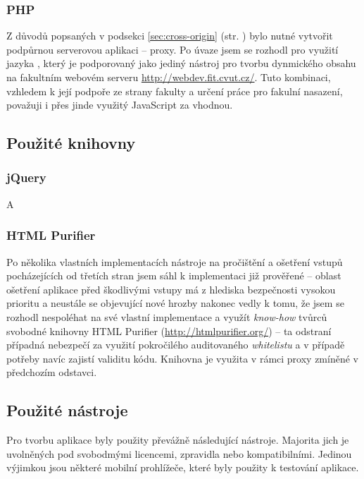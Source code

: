 \subsubsection{PHP}
Z důvodů popsaných v podsekci \ref{sec:cross-origin} (str. \pageref{sec:cross-origin}) bylo nutné vytvořit podpůrnou serverovou aplikaci -- proxy. Po úvaze jsem se rozhodl pro využití jazyka , který je podporovaný jako jediný nástroj pro tvorbu dynmického obsahu na fakultním webovém serveru \url{http://webdev.fit.cvut.cz/}. Tuto kombinaci, vzhledem k její podpoře ze strany fakulty a určení práce pro fakulní nasazení, považuji i přes jinde využitý JavaScript za vhodnou.


\subsection{Použité knihovny}

\subsubsection{jQuery}
A

\subsubsection{HTML Purifier}
Po několika vlastních implementacích nástroje na pročištění a ošetření  vstupů pocházejících od třetích stran jsem sáhl k implementaci již prověřené -- oblast ošetření aplikace před škodlivými vstupy má z hlediska bezpečnosti vysokou prioritu a neustále se objevující nové hrozby nakonec vedly k tomu, že jsem se rozhodl nespoléhat na své vlastní implementace a využít \textit{know-how} tvůrců svobodné  knihovny  HTML Purifier (\url{http://htmlpurifier.org/}) -- ta odstraní případná nebezpečí za využití pokročilého auditovaného \textit{whitelistu} a v případě potřeby navíc zajistí validitu kódu. Knihovna je využita v rámci proxy zmíněné v předchozím odstavci.


\subsection{Použité nástroje}
Pro tvorbu aplikace byly použity převážně následující nástroje. Majorita jich je uvolněných pod svobodmými licencemi, zpravidla   nebo kompatibilními. Jedinou výjimkou jsou některé mobilní prohlížeče, které byly použity k testování aplikace.

